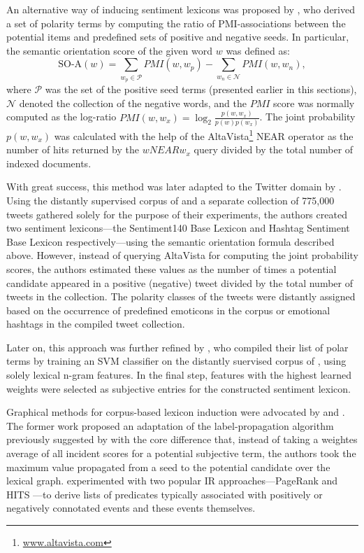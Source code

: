 An alternative way of inducing sentiment lexicons was proposed by
\citet{Turney:03}, who derived a set of polarity terms by computing
the ratio of PMI-associations between the potential items and
predefined sets of positive and negative seeds.  In particular, the
semantic orientation score of the given word $w$ was defined as:
\begin{equation*}
  \textrm{SO-A}(w) = \sum_{w_p\in\mathcal{P}}PMI(w, w_p) - \sum_{w_n\in\mathcal{N}}PMI(w, w_n),
\end{equation*}
where $\mathcal{P}$ was the set of the positive seed terms (presented
earlier in this sections), $\mathcal{N}$ denoted the collection of the
negative words, and the $PMI$ score was normally computed as the
log-ratio $PMI(w, w_x) = \log_2\frac{p(w, w_x)}{p(w)p(w_x)}$.  The
joint probability $p(w, w_x)$ was calculated with the help of the
AltaVista\footnote{\url{www.altavista.com}} NEAR operator as the
number of hits returned by the $w NEAR w_x$ query divided by the total
number of indexed documents.

With great success, this method was later adapted to the Twitter
domain by \citet{Kiritchenko:14}.  Using the distantly supervised
corpus of \citet{Go:09} and a separate collection of 775,000 tweets
gathered solely for the purpose of their experiments, the authors
created two sentiment lexicons---the Sentiment140 Base Lexicon and
Hashtag Sentiment Base Lexicon respectively---using the semantic
orientation formula described above.  However, instead of querying
AltaVista for computing the joint probability scores, the authors
estimated these values as the number of times a potential candidate
appeared in a positive (negative) tweet divided by the total number of
tweets in the collection.  The polarity classes of the tweets were
distantly assigned based on the occurrence of predefined emoticons in
the \citet{Go:09} corpus or emotional hashtags in the compiled tweet
collection.

Later on, this approach was further refined by \citet{Severyn:15a},
who compiled their list of polar terms by training an SVM classifier
on the distantly suervised corpus of \citet{Go:09}, using solely
lexical n-gram features.  In the final step, features with the highest
learned weights were selected as subjective entries for the
constructed sentiment lexicon.

Graphical methods for corpus-based lexicon induction were advocated by
\citet{Velikovich:10} and \citet{Feng:11}.  The former work proposed
an adaptation of the label-propagation algorithm previously suggested
by \citet{Rao:09} with the core difference that, instead of taking a
weightes average of all incident scores for a potential subjective
term, the authors took the maximum value propagated from a seed to the
potential candidate over the lexical graph.  \citet{Feng:11}
experimented with two popular IR approaches---PageRank \cite{Brin:98}
and HITS \cite{Kleinberg:99}---to derive lists of predicates
typically associated with positively or negatively connotated events
and these events themselves.

